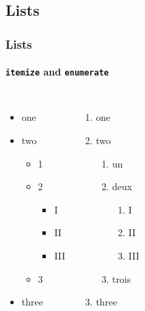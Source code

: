 \documentclass[aspectratio=169]{beamer}
\begin{document}
\subsection{Lists}
\begin{frame}
  \frametitle{Lists}
  \framesubtitle{\texttt{itemize} and \texttt{enumerate}}
  \begin{columns}
    \column{1em}
    \column{.5\paperwidth}
    \begin{itemize}
    \item one
    \item two
      \begin{itemize}
      \item 1
      \item 2
        \begin{itemize}
        \item I
        \item II
        \item III
        \end{itemize}
      \item 3
      \end{itemize}
    \item three
    \end{itemize}

    \column{.5\paperwidth}
    \begin{enumerate}
    \item one
    \item two
      \begin{enumerate}
      \item un
      \item deux
        \begin{enumerate}
        \item I
        \item II
        \item III
        \end{enumerate}
      \item trois
      \end{enumerate}
    \item three
    \end{enumerate}
  \end{columns}
\end{frame}
\end{document}
